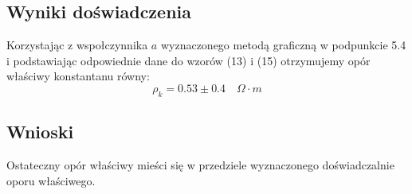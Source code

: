 \documentclass{article} %
\begin{document}
\subsection{Wyniki doświadczenia}

Korzystając z wspołczynnika $a$ wyznaczonego metodą graficzną w podpunkcie 5.4 i podstawiając odpowiednie dane do wzorów (13) i (15) otrzymujemy opór właściwy konstantanu równy:
{\large
\begin{equation}
    \rho_k =  0.53 \pm 0.4 \quad\Omega \cdot m
\end{equation}
}
\subsection{Wnioski}
Ostateczny opór właściwy mieści się w przedziele wyznaczonego doświadczalnie oporu właściwego.
\end{document}
